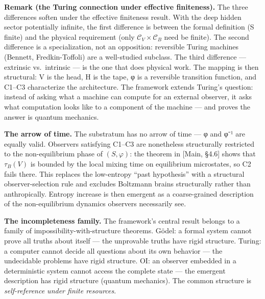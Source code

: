 \documentclass[
]{article}
\begin{document}
\textbf{Remark (the Turing connection under effective finiteness).} The
three differences soften under the effective finiteness result. With the
deep hidden sector potentially infinite, the first difference is between
the formal definition (S finite) and the physical requirement (only
\(\mathcal{C}_V \times \mathcal{C}_B\) need be finite). The second
difference is a specialization, not an opposition: reversible Turing
machines (Bennett, Fredkin-Toffoli) are a well-studied subclass. The
third difference --- extrinsic vs.~intrinsic --- is the one that does
physical work. The mapping is then structural: V is the head, H is the
tape, φ is a reversible transition function, and C1--C3 characterize the
architecture. The framework extends Turing's question: instead of asking
what a machine can compute for an external observer, it asks what
computation looks like to a component of the machine --- and proves the
answer is quantum mechanics.

\textbf{The arrow of time.} The substratum has no arrow of time --- φ
and φ⁻¹ are equally valid. Observers satisfying C1--C3 are nonetheless
structurally restricted to the non-equilibrium phase of
\((S, \varphi)\): the theorem in {[}Main, §4.6{]} shows that
\(\tau_B(V)\) is bounded by the local mixing time on equilibrium
microstates, so C2 fails there. This replaces the low-entropy ``past
hypothesis'' with a structural observer-selection rule and excludes
Boltzmann brains structurally rather than anthropically. Entropy
increase is then emergent as a coarse-grained description of the
non-equilibrium dynamics observers necessarily see.

\textbf{The incompleteness family.} The framework's central result
belongs to a family of impossibility-with-structure theorems. Gödel: a
formal system cannot prove all truths about itself --- the unprovable
truths have rigid structure. Turing: a computer cannot decide all
questions about its own behavior --- the undecidable problems have rigid
structure. OI: an observer embedded in a deterministic system cannot
access the complete state --- the emergent description has rigid
structure (quantum mechanics). The common structure is
\emph{self-reference under finite resources}.
\end{document}

